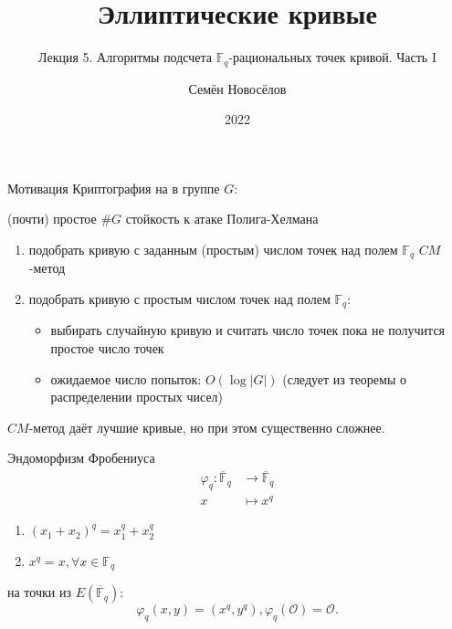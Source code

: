 \documentclass{beamer}
\title{Эллиптические кривые}
\subtitle{Лекция 5. Алгоритмы подсчета $\mathbb{F}_q$-рациональных точек кривой. Часть I}
\author{Семён Новосёлов}
\institute{БФУ им. И. Канта}
\date{2022}
\begin{document}
\frame{\titlepage}

\begin{frame}{Мотивация}
    Криптография на  в группе $G$:
    \begin{center}
    (почти) простое $\#G$ \structure{$\implies$} стойкость к атаке Полига-Хелмана
    \end{center}
    
    \begin{enumerate}
        \item подобрать кривую с заданным (простым) числом точек над полем $\mathbb{F}_q$ \structure{$\implies$} $CM$-метод
        \item подобрать кривую с простым числом точек над полем $\mathbb{F}_q$:
        \begin{itemize}
            \item выбирать случайную кривую и считать число точек пока не получится простое число точек
            \item ожидаемое число попыток: $O(\log{|G|})$ (следует из теоремы о распределении простых чисел)
        \end{itemize}
    \end{enumerate}
    $CM$-метод даёт лучшие кривые, но при этом существенно сложнее.
\end{frame}

\begin{frame}{Эндоморфизм Фробениуса}
\begin{equation*}
    \begin{split}
        \varphi_q: \overline{\mathbb{F}}_q &\rightarrow \overline{\mathbb{F}}_q \\
                 x & \mapsto x^q
    \end{split}
\end{equation*}

\begin{enumerate}
    \item $(x_1 + x_2)^q = x_1^q + x_2^q$
    \item $x^q = x, \forall x \in {\mathbb{F}_q}$
\end{enumerate}

 на точки из $E(\overline{\mathbb{F}}_q)$:
\[
\varphi_q(x, y) = (x^q, y^q), \varphi_q(\mathcal{O}) = \mathcal{O}.
\]
\end{frame}
\end{document}
